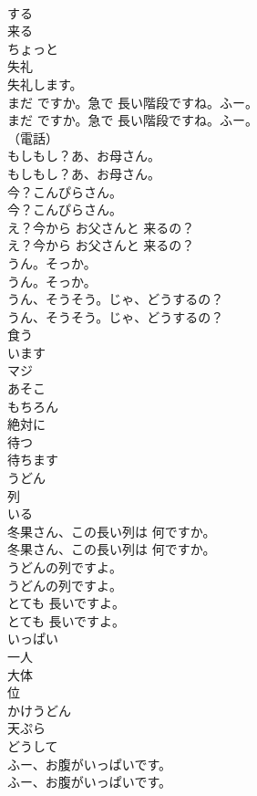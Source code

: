 \documentclass[8pt]{extreport}
\begin{document}
\begin{CJK}{UTF8}{min}
\\	する
\\	来る
\\	ちょっと
\\	失礼
\\	失礼します。
\\	まだ ですか。急で 長い階段ですね。ふー。	
\\	まだ ですか。急で 長い階段ですね。ふー。 
\\	（電話）	
\\	もしもし？あ、お母さん。	
\\	もしもし？あ、お母さん。 
\\	今？こんぴらさん。	
\\	今？こんぴらさん。 
\\	え？今から お父さんと 来るの？	
\\	え？今から お父さんと 来るの？ 
\\	うん。そっか。	
\\	うん。そっか。 
\\	うん、そうそう。じゃ、どうするの？	
\\	うん、そうそう。じゃ、どうするの？ 
\\	食う
\\	います
\\	マジ
\\	あそこ
\\	もちろん
\\	絶対に
\\	待つ
\\	待ちます
\\	うどん
\\	列
\\	いる
\\	冬果さん、この長い列は 何ですか。	
\\	冬果さん、この長い列は 何ですか。 
\\	うどんの列ですよ。	
\\	うどんの列ですよ。 
\\	とても 長いですよ。	
\\	とても 長いですよ。 
\\	いっぱい
\\	一人
\\	大体
\\	位
\\	かけうどん
\\	天ぷら
\\	どうして
\\	ふー、お腹がいっぱいです。	
\\	ふー、お腹がいっぱいです。 

\end{CJK}
\end{document}
